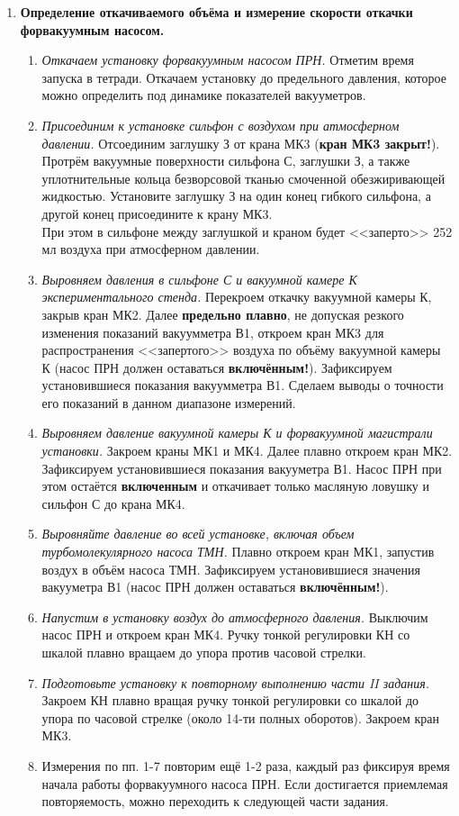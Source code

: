 \documentclass[a4paper,12pt]{article}
\begin{document}
\begin{enumerate}
\item \textbf{Определение откачиваемого объёма и измерение скорости откачки форвакуумным насосом.}
\begin{enumerate}
	\item \textit{Откачаем установку форвакуумным насосом ПРН.} Отметим время запуска  в тетради. Откачаем установку до предельного давления, которое можно определить под динамике показателей вакууметров.
	\item \textit{Присоединим к установке сильфон с воздухом при атмосферном давлении.} Отсоединим заглушку З от крана МК3 (\textbf{кран МК3 закрыт!}). Протрём вакуумные поверхности сильфона С, заглушки З, а также уплотнительные кольца безворсовой тканью смоченной обезжиривающей жидкостью. Установите заглушку З на один конец гибкого сильфона, а другой конец присоедините к крану МК3. \\ При этом в сильфоне между заглушкой и краном будет <<заперто>> 252 мл воздуха при атмосферном давлении. 
	\item \textit{Выровняем давления в сильфоне С и вакуумной камере К экспериментального стенда.} Перекроем откачку вакуумной камеры К, закрыв кран МК2. Далее \textbf{предельно  плавно},  не допуская  резкого  изменения  показаний  вакуумметра В1, откроем кран МК3 для распространения <<запертого>> воздуха по объёму вакуумной камеры К (насос ПРН должен оставаться \textbf{включённым!}). Зафиксируем установившиеся показания  вакуумметра В1. Сделаем  выводы  о точности  его  показаний  в данном  диапазоне  измерений. 
	\item \textit{Выровняем давление вакуумной камеры К и форвакуумной магистрали установки.} Закроем  краны МК1  и МК4.  Далее  плавно  откроем  кран  МК2. Зафиксируем установившиеся показания вакууметра В1. Насос ПРН при этом остаётся \textbf{включенным} и откачивает только масляную ловушку и сильфон С до крана МК4. 
	\item \textit{Выровняйте  давление  во  всей  установке,  включая  объем  турбомолекулярного насоса ТМН.} Плавно откроем кран МК1, запустив воздух в объём насоса ТМН. Зафиксируем установившиеся значения вакууметра В1 (насос ПРН должен оставаться \textbf{включённым!}). 
	\item \textit{Напустим в установку воздух до атмосферного давления.} Выключим насос ПРН и откроем кран МК4. Ручку тонкой регулировки КН со шкалой плавно вращаем до упора против часовой стрелки.
	\item \textit{Подготовьте  установку  к  повторному  выполнению  части II  задания.}
	Закроем КН плавно вращая ручку тонкой регулировки со шкалой до упора  по часовой  стрелке  (около  14-ти  полных  оборотов).  Закроем кран МК3.
	\item Измерения по пп. 1-7 повторим ещё 1-2 раза, каждый  раз фиксируя время начала работы форвакуумного насоса ПРН. Если  достигается  приемлемая  повторяемость,  можно  переходить к следующей части задания.
	

\end{enumerate}
\end{enumerate}
\end{document}
